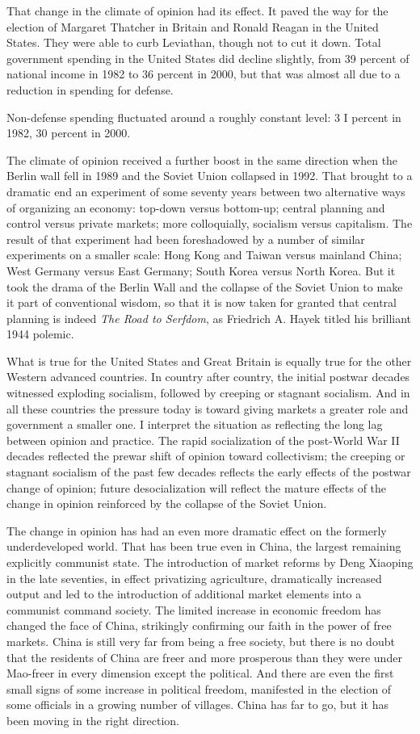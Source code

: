 \documentclass[11pt,openany]{book}
\begin{document}
That change in the climate of opinion had its effect. It paved the way for the election of Margaret Thatcher in Britain and Ronald Reagan in the United States. They were able to curb Leviathan, though not to cut it down. Total government spending in the United States did decline slightly, from 39 percent of national income in 1982 to 36 percent in 2000, but that was almost all due to a reduction in spending for defense.

Non-defense spending fluctuated around a roughly constant level: 3 I percent in 1982, 30 percent in 2000.

The climate of opinion received a further boost in the same direction when the Berlin wall fell in 1989 and the Soviet Union collapsed in 1992. That brought to a dramatic end an experiment of some seventy years between two alternative ways of organizing an economy: top-down versus bottom-up; central planning and control versus private markets; more colloquially, socialism versus capitalism. The result of that experiment had been foreshadowed by a number of similar experiments on a smaller scale: Hong Kong and Taiwan versus mainland China; West Germany versus East Germany; South Korea versus North Korea. But it took the drama of the Berlin Wall and the collapse of the Soviet Union to make it part of conventional wisdom, so that it is now taken for granted that central planning is indeed \emph{The Road to Serfdom}, as Friedrich A. Hayek titled his brilliant 1944 polemic.

What is true for the United States and Great Britain is equally true for the other Western advanced countries. In country after country, the initial postwar decades witnessed exploding socialism, followed by creeping or stagnant socialism. And in all these countries the pressure today is toward giving markets a greater role and government a smaller one. I interpret the situation as reflecting the long lag between opinion and practice. The rapid socialization of the post-World War II decades reflected the prewar shift of opinion toward collectivism; the creeping or stagnant socialism of the past few decades reflects the early effects of the postwar change of opinion; future desocialization will reflect the mature effects of the change in opinion reinforced by the collapse of the Soviet Union.

The change in opinion has had an even more dramatic effect on the formerly underdeveloped world. That has been true even in China, the largest remaining explicitly communist state. The introduction of market reforms by Deng Xiaoping in the late seventies, in effect privatizing agriculture, dramatically increased output and led to the introduction of additional market elements into a communist command society. The limited increase in economic freedom has changed the face of China, strikingly confirming our faith in the power of free markets. China is still very far from being a free society, but there is no doubt that the residents of China are freer and more prosperous than they were under Mao-freer in every dimension except the political. And there are even the first small signs of some increase in political freedom, manifested in the election of some officials in a growing number of villages. China has far to go, but it has been moving in the right direction.
\end{document}
